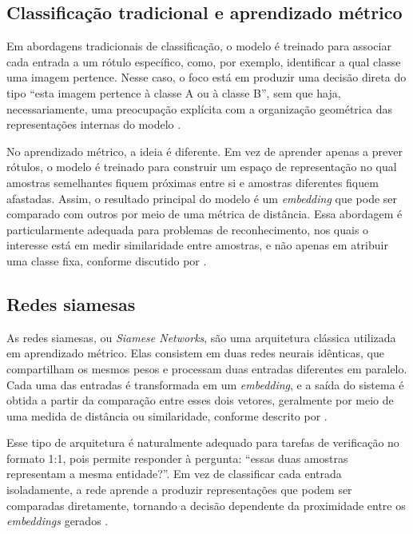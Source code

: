 \subsection{Classificação tradicional e aprendizado métrico}

Em abordagens tradicionais de classificação, o modelo é treinado para associar cada entrada a um rótulo específico, como, por exemplo, identificar a qual classe uma imagem pertence. Nesse caso, o foco está em produzir uma decisão direta do tipo “esta imagem pertence à classe A ou à classe B”, sem que haja, necessariamente, uma preocupação explícita com a organização geométrica das representações internas do modelo \cite{bishop2006prml}.

No aprendizado métrico, a ideia é diferente. Em vez de aprender apenas a prever rótulos, o modelo é treinado para construir um espaço de representação no qual amostras semelhantes fiquem próximas entre si e amostras diferentes fiquem afastadas. Assim, o resultado principal do modelo é um \textit{embedding} que pode ser comparado com outros por meio de uma métrica de distância. Essa abordagem é particularmente adequada para problemas de reconhecimento, nos quais o interesse está em medir similaridade entre amostras, e não apenas em atribuir uma classe fixa, conforme discutido por \textcite{bellet2015survey}.

\subsection{Redes siamesas}

As redes siamesas, ou \textit{Siamese Networks}, são uma arquitetura clássica utilizada em aprendizado métrico. Elas consistem em duas redes neurais idênticas, que compartilham os mesmos pesos e processam duas entradas diferentes em paralelo. Cada uma das entradas é transformada em um \textit{embedding}, e a saída do sistema é obtida a partir da comparação entre esses dois vetores, geralmente por meio de uma medida de distância ou similaridade, conforme descrito por \textcite{koch2015siamese}.

Esse tipo de arquitetura é naturalmente adequado para tarefas de verificação no formato 1:1, pois permite responder à pergunta: “essas duas amostras representam a mesma entidade?”. Em vez de classificar cada entrada isoladamente, a rede aprende a produzir representações que podem ser comparadas diretamente, tornando a decisão dependente da proximidade entre os \textit{embeddings} gerados \cite{koch2015siamese}.

